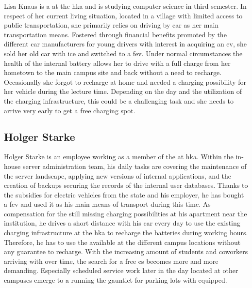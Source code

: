 Lisa Knaus is a  at the \acrshort{hka} and is studying computer science in third semester. In respect of her current living situation, located in a village with limited access to public transportation, she primarily relies on driving by car as her main transportation means.
Fostered through financial benefits promoted by the different car manufacturers for young drivers with interest in acquiring an \acrshort{ev}, she sold her old car with \acrshort{ice} and switched to a \acrfull{fev}. 
Under normal circumstances the health of the internal battery allows her to drive with a full charge from her hometown to the main campus site and back without a need to recharge. Occasionally she forgot to recharge at home and needed a charging possibility for her vehicle during the lecture time.
Depending on the day and the utilization of the charging infrastructure, this could be a challenging task and she needs to arrive very early to get a free charging spot.

\subsection{Holger Starke}
\label{ch:Requirements Engineering:sec:Personas:ssec:Holger Starke}

Holger Starke is an employee working as a member of the  at \acrshort{hka}. Within the in-house server administration team, his daily tasks are covering the maintenance of the server landscape, applying new versions of internal applications, and the creation of backups securing the records of the internal user databases. 
Thanks to the subsidies for electric vehicles from the state and his employer, he has bought a \acrshort{fev} and used it as his main means of transport during this time.
As compensation for the still missing charging possibilities at his apartment near the institution, he drives a short distance with his car every day to use the existing charging infrastructure at the \acrshort{hka} to recharge the batteries during working hours.
Therefore, he has to use the available  at the different campus locations without any guarantee to recharge. With the increasing amount of students and coworkers arriving with  over time, the search for a free \acrshort{cs} becomes more and more demanding.
Especially scheduled service work later in the day located at other campuses emerge to a running the gauntlet for parking lots with  equipped. 

